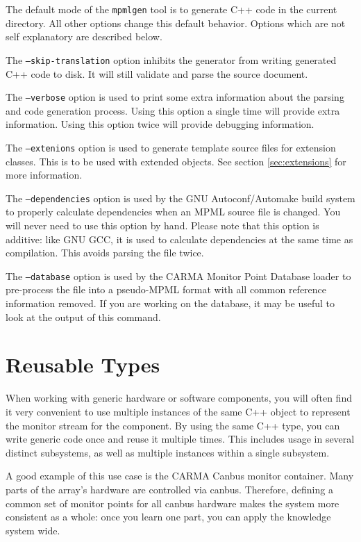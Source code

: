 \documentclass[letterpaper,12pt,oneside,pdftex]{article}
\begin{document}
The default mode of the \texttt{mpmlgen} tool is to generate C++ code in the
current directory. All other options change this default behavior. Options which
are not self explanatory are described below.

The \texttt{--skip-translation} option inhibits the generator from writing
generated C++ code to disk. It will still validate and parse the source
document.

The \texttt{--verbose} option is used to print some extra information about the
parsing and code generation process. Using this option a single time will
provide extra information. Using this option twice will provide debugging
information.

The \texttt{--extenions} option is used to generate template source files for
extension classes. This is to be used with extended objects. See section
\ref{sec:extensions} for more information.

The \texttt{--dependencies} option is used by the GNU Autoconf/Automake build
system to properly calculate dependencies when an MPML source file is changed.
You will never need to use this option by hand. Please note that this option is
additive: like GNU GCC, it is used to calculate dependencies at the same time as
compilation. This avoids parsing the file twice.

The \texttt{--database} option is used by the CARMA Monitor Point Database
loader to pre-process the file into a pseudo-MPML format with all common
reference information removed. If you are working on the database, it may be
useful to look at the output of this command.

\section{Reusable Types}

When working with generic hardware or software components, you will often find
it very convenient to use multiple instances of the same C++ object to represent
the monitor stream for the component. By using the same C++ type, you can write
generic code once and reuse it multiple times. This includes usage in several
distinct subsystems, as well as multiple instances within a single subsystem.

A good example of this use case is the CARMA Canbus monitor container. Many
parts of the array's hardware are controlled via canbus. Therefore, defining a
common set of monitor points for all canbus hardware makes the system more
consistent as a whole: once you learn one part, you can apply the knowledge
system wide.
\end{document}
